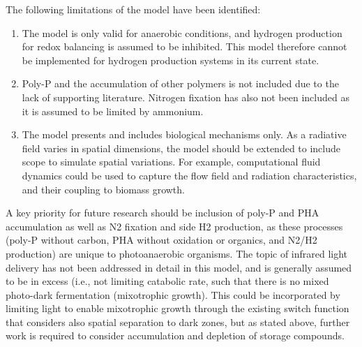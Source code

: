 The following limitations of the model have been identified:
\begin{enumerate}
    \item The model is only valid for anaerobic conditions, and hydrogen production for redox balancing is assumed to be inhibited. This model therefore cannot be implemented for hydrogen production systems in its current state.
    \item Poly-P and the accumulation of other polymers is not included due to the lack of supporting literature. Nitrogen fixation has also not been included as it is assumed to be limited by ammonium.
    \item The model presents and includes biological mechanisms only. As a radiative field varies in spatial dimensions, the model should be extended to include scope to simulate spatial variations. For example, computational fluid dynamics could be used to capture the flow field and radiation characteristics, and their coupling to biomass growth. 
\end{enumerate}


A key priority for future research should be inclusion of poly-P and PHA accumulation as well as N2 fixation and side H2 production, as these processes (poly-P without carbon, PHA without oxidation or organics, and N2/H2 production) are unique to photoanaerobic organisms. The topic of infrared light delivery has not been addressed in detail in this model, and is generally assumed to be in excess (i.e., not limiting catabolic rate, such that there is no mixed photo-dark fermentation (mixotrophic growth). This could be incorporated by limiting light to enable mixotrophic growth through the existing switch function that considers also spatial separation to dark zones, but as stated above, further work is required to consider accumulation and depletion of storage compounds. 
